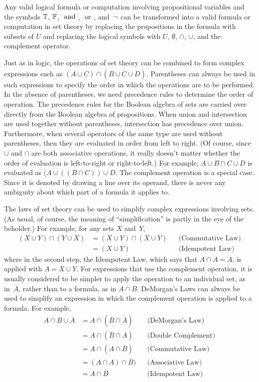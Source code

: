 \noindent Any valid logical formula or computation involving
propositional variables and the symbols $\mathbb{T}$, $\mathbb{F}$, $\text{ and }$, $\text{ or }$,
and~$\lnot$ can be transformed into a valid formula or computation in
set theory by replacing the propositions in the formula with subsets of $U$ and
replacing the logical symbols with $U$, $\emptyset$, $\cap$, $\cup$, and the
complement operator.  

Just as in logic, the operations of set theory can be combined
to form complex expressions such as $(A\cup C)\cap\overline{(B\cup \overline{C} \cup D)}$.
Parentheses can always be used in such expressions to specify the
order in which the operations are to be performed.  In the absence of
parentheses, we need precedence rules to determine
the order of operation.  The precedence rules for the Boolean algebra
of sets are carried over directly from the Boolean algebra of
propositions.  When union and intersection are used together without
parentheses, intersection has precedence over union.  Furthermore,
when several operators of the same type are used without parentheses,
then they are evaluated in order from left to right.
(Of course, since $\cup$ and $\cap$ are both associative operations,
it really doesn't matter whether the order of evaluation is left-to-right
or right-to-left.)  For example, $A\cup B\cap C \cup D$ is evaluated as 
$(A\cup((B\cap C))\cup D$.  The complement operation is a special case.
Since it is denoted by drawing a line over its operand, there is
never any ambiguity about which part of a formula it applies to.

The laws of set theory can be used to simplify complex expressions
involving sets.  (As usual, of course, the meaning of ``simplification'' is
partly in the eye of the beholder.)  For example, for any sets $X$
and~$Y$,
\begin{align*}
(X\cup Y)\cap(Y\cup X)&=(X\cup Y)\cap(X\cup Y) &&\text{(Commutative Law)}\\
                      &=(X\cup Y)              &&\text{(Idempotent Law)}
\end{align*}
where in the second step, the Idempotent Law, which says that
$A\cap A=A$, is applied with $A=X\cup Y$.  For expressions that
use the complement operation, it is usually considered to be simpler
to apply the operation to an individual set, as in~$\overline{A}$,
rather than to a formula, as in $\overline{A\cap B}$.  DeMorgan's
Laws can always be used to simplify an expression in which the 
complement operation is applied to a formula.  For example,
\begin{align*}
A\cap \overline{B\cup\overline{A}}
        &= A\cap (\overline{B}\cap\overline{\overline{A}})   && \text{(DeMorgan's Law)}\\
        &= A\cap (\overline{B}\cap A)   && \text{(Double Complement)}\\
        &= A\cap (A\cap\overline{B})    && \text{(Commutative Law)}\\
        &= (A\cap A)\cap \overline{B})  && \text{(Associative Law)}\\
        &= A \cap \overline{B}          && \text{(Idempotent Law)}
\end{align*}

